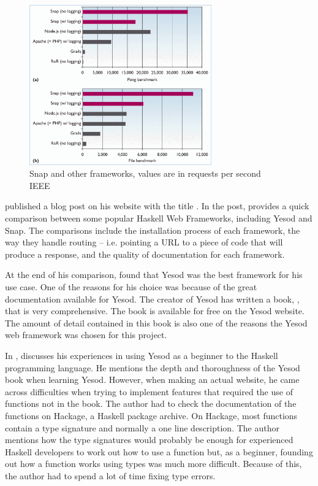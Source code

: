 \begin{figure}[H]
    \centering
    \includegraphics[width=0.7\textwidth]{final_report/pics/snapBenchmark.png}
    \caption{Snap and other frameworks, values are in requests per second \\ \textcopyright{} \citeyear{snapFramework} IEEE}
    \label{fig:snapBenchmark}
\end{figure}

\citeauthor{haskellWebComparison} published a blog post on his website with the
title . In the post, \citeauthor{haskellWebComparison}
provides a quick comparison between some popular Haskell Web Frameworks, including
Yesod and Snap. The comparisons include the installation process of each framework,
the way they handle routing -- i.e. pointing a URL to a piece of code that will 
produce a response, and the quality of documentation for each framework. \parencite{haskellWebComparison}

At the end of his comparison, \citeauthor{haskellWebComparison} found that Yesod
was the best framework for his use case. One of the reasons for his choice was
because of the great documentation available for Yesod. The creator of Yesod
has written a book, , that is very comprehensive. The book
is available for free on the Yesod website. The amount of detail contained in this
book is also one of the reasons the Yesod web framework was chosen for this
project. \parencite{haskellWebComparison,yesodBook}

In , \citeauthor{beginnerYesod} discusses his experiences
in using Yesod as a beginner to the Haskell programming language. He mentions
the depth and thoroughness of the Yesod book when learning Yesod. However, when
making an actual website, he came across difficulties when trying to implement
features that required the use of functions not in the book. The author had
to check the documentation of the functions on Hackage, a Haskell package archive.
On Hackage, most functions contain a type signature and normally a one line
description. The author mentions how the type signatures would probably be
enough for experienced Haskell developers to work out how to use a function
but, as a beginner, founding out how a function works using types was much more
difficult. Because of this, the author had to spend a lot of time fixing type
errors. \parencite{beginnerYesod}

